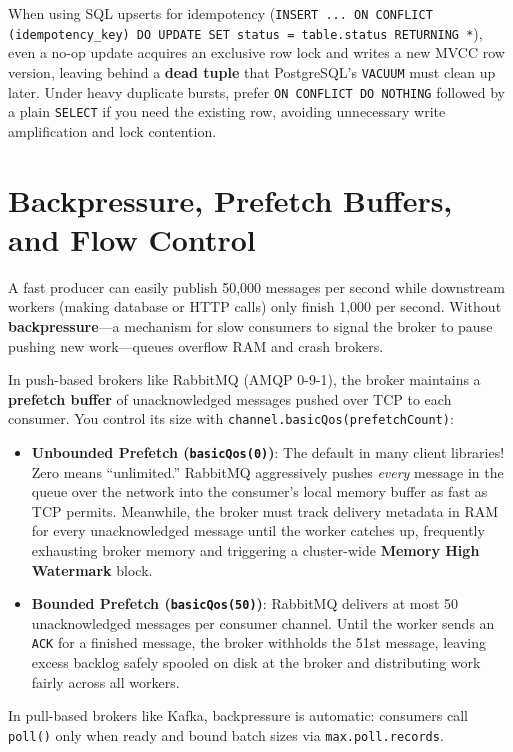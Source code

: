 \begin{commonmistakebox}
When using SQL upserts for idempotency (\texttt{INSERT ... ON CONFLICT (idempotency\_key) DO UPDATE SET status = table.status RETURNING *}), even a no-op update acquires an exclusive row lock and writes a new MVCC row version, leaving behind a \textbf{dead tuple} that PostgreSQL's \texttt{VACUUM} must clean up later. Under heavy duplicate bursts, prefer \texttt{ON CONFLICT DO NOTHING} followed by a plain \texttt{SELECT} if you need the existing row, avoiding unnecessary write amplification and lock contention.
\end{commonmistakebox}

\section{Backpressure, Prefetch Buffers, and Flow Control}

A fast producer can easily publish 50,000 messages per second while downstream workers (making database or HTTP calls) only finish 1,000 per second. Without \textbf{backpressure}---a mechanism for slow consumers to signal the broker to pause pushing new work---queues overflow RAM and crash brokers.

In push-based brokers like RabbitMQ (AMQP 0-9-1), the broker maintains a \textbf{prefetch buffer} of unacknowledged messages pushed over TCP to each consumer. You control its size with \texttt{channel.basicQos(prefetchCount)}:
\begin{itemize}[leftmargin=18pt]
  \item \textbf{Unbounded Prefetch (\texttt{basicQos(0)})}: The default in many client libraries! Zero means ``unlimited.'' RabbitMQ aggressively pushes \emph{every} message in the queue over the network into the consumer's local memory buffer as fast as TCP permits. Meanwhile, the broker must track delivery metadata in RAM for every unacknowledged message until the worker catches up, frequently exhausting broker memory and triggering a cluster-wide \textbf{Memory High Watermark} block.
  \item \textbf{Bounded Prefetch (\texttt{basicQos(50)})}: RabbitMQ delivers at most 50 unacknowledged messages per consumer channel. Until the worker sends an \texttt{ACK} for a finished message, the broker withholds the 51st message, leaving excess backlog safely spooled on disk at the broker and distributing work fairly across all workers.
\end{itemize}
In pull-based brokers like Kafka, backpressure is automatic: consumers call \texttt{poll()} only when ready and bound batch sizes via \texttt{max.poll.records}.

